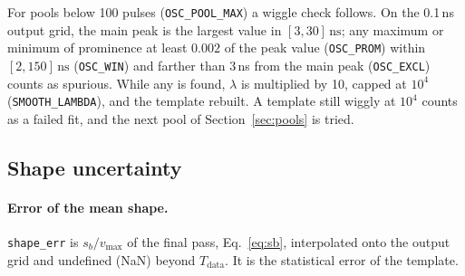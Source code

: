 \documentclass[11pt]{article}
\newcommand{\ns}{\,\mathrm{ns}}
\newcommand{\code}[1]{\texttt{#1}}
\begin{document}
For pools below 100 pulses (\code{OSC\_POOL\_MAX}) a wiggle check follows. On the 0.1\,ns output grid, the main peak is the largest value in $[3, 30]\ns$; any maximum or minimum of prominence at least $0.002$ of the peak value (\code{OSC\_PROM}) within $[2, 150]\ns$ (\code{OSC\_WIN}) and farther than 3\,ns from the main peak (\code{OSC\_EXCL}) counts as spurious. While any is found, $\lambda$ is multiplied by 10, capped at $10^4$ (\code{SMOOTH\_LAMBDA}), and the template rebuilt. A template still wiggly at $10^4$ counts as a failed fit, and the next pool of Section~\ref{sec:pools} is tried.

\subsection{Shape uncertainty}
\label{sec:unc}

\paragraph{Error of the mean shape.} \code{shape\_err} is $s_b / v_{\max}$ of the final pass, Eq.~\eqref{eq:sb}, interpolated onto the output grid and undefined (NaN) beyond $T_{\mathrm{data}}$. It is the statistical error of the template.
\end{document}
